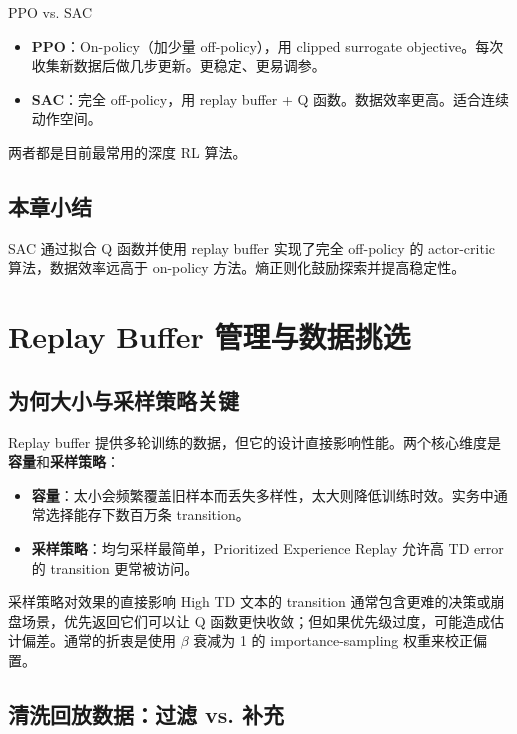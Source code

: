 \documentclass[a4paper]{article}
\begin{document}
\begin{importantbox}{PPO vs. SAC}
\begin{itemize}
    \item \textbf{PPO}：On-policy（加少量 off-policy），用 clipped surrogate objective。每次收集新数据后做几步更新。更稳定、更易调参。
    \item \textbf{SAC}：完全 off-policy，用 replay buffer + Q 函数。数据效率更高。适合连续动作空间。
\end{itemize}
两者都是目前最常用的深度 RL 算法。
\end{importantbox}

\subsection{本章小结}

SAC 通过拟合 Q 函数并使用 replay buffer 实现了完全 off-policy 的 actor-critic 算法，数据效率远高于 on-policy 方法。熵正则化鼓励探索并提高稳定性。

\section{Replay Buffer 管理与数据挑选}

\subsection{为何大小与采样策略关键}

Replay buffer 提供多轮训练的数据，但它的设计直接影响性能。两个核心维度是\textbf{容量}和\textbf{采样策略}：

\begin{itemize}
    \item \textbf{容量}：太小会频繁覆盖旧样本而丢失多样性，太大则降低训练时效。实务中通常选择能存下数百万条 transition。
    \item \textbf{采样策略}：均匀采样最简单，Prioritized Experience Replay 允许高 TD error 的 transition 更常被访问。
\end{itemize}

\begin{knowledgebox}{采样策略对效果的直接影响}
High TD 文本的 transition 通常包含更难的决策或崩盘场景，优先返回它们可以让 Q 函数更快收敛；但如果优先级过度，可能造成估计偏差。通常的折衷是使用 $\beta$ 衰减为 1 的 importance-sampling 权重来校正偏置。
\end{knowledgebox}

\subsection{清洗回放数据：过滤 vs. 补充}
\end{document}
